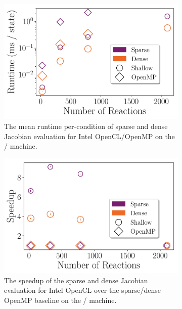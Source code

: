 \documentclass[12pt,number,sort&compress,preprint]{elsarticle}
\begin{document}
\begin{figure}[htbp]
   \centering
  \begin{subfigure}[t]{0.48\linewidth}
      \includegraphics[width=\textwidth]{sparse_vs_dense.pdf}
      \caption{The mean runtime per-condition of sparse and dense Jacobian evaluation for Intel OpenCL\slash OpenMP on the \avx/ machine.}
      \label{F:sparse_vs_dense}
  \end{subfigure}
  \hfill
  \begin{subfigure}[t]{0.48\linewidth}
      \includegraphics[width=\textwidth]{sparse_vs_dense_speedup.pdf}
      \caption{The speedup of the sparse and dense Jacobian evaluation for Intel OpenCL over the sparse\slash dense OpenMP baseline on the \avx/ machine.}
      \label{F:sparse_vs_dense_speedup}
  \end{subfigure}
  \\
  \begin{subfigure}[t]{0.48\linewidth}

\end{subfigure}
\end{figure}
\end{document}
